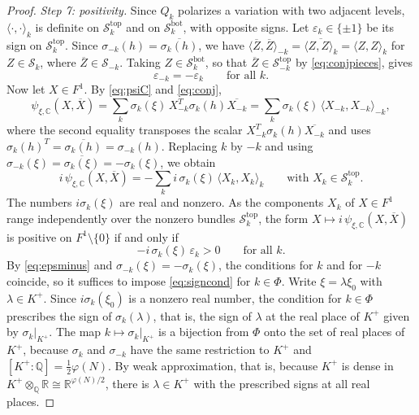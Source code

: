 \documentclass[11pt]{amsart}
\theoremstyle{definition}
\theoremstyle{remark}
\numberwithin{equation}{section}
\newcommand{\Q}{\mathbb{Q}}
\newcommand{\C}{\mathbb{C}}
\newcommand{\R}{\mathbb{R}}
\newcommand{\cS}{\mathcal{S}}
\newcommand{\tp}{\mathrm{top}}
\newcommand{\bt}{\mathrm{bot}}
\begin{document}
\begin{proof}
\emph{Step 7: positivity.} Since $Q_k$ polarizes a variation with two adjacent levels, $\langle\cdot,\cdot\rangle_k$ is definite on $\cS_k^{\tp}$ and on $\cS_k^{\bt}$, with opposite signs. Let $\varepsilon_k\in\{\pm1\}$ be its sign on $\cS_k^{\tp}$. Since $\sigma_{-k}(h)=\overline{\sigma_k(h)}$, we have $\langle\overline Z,\overline Z\rangle_{-k}=\overline{\langle Z,Z\rangle_k}=\langle Z,Z\rangle_k$ for $Z\in\cS_k$, where $\overline Z\in\cS_{-k}$. Taking $Z\in\cS_k^{\bt}$, so that $\overline Z\in\cS_{-k}^{\tp}$ by \eqref{eq:conjpieces}, gives
\begin{equation}\label{eq:epsminus}
\varepsilon_{-k}=-\varepsilon_k\qquad\text{for all }k .
\end{equation}
Now let $X\in F^1$. By \eqref{eq:psiC} and \eqref{eq:conj},
\[
\psi_{\xi,\C}(X,\overline X)=\sum_k\sigma_k(\xi)\,X_{-k}^{T}\sigma_k(h)\overline{X_{-k}}=\sum_k\sigma_k(\xi)\,\langle X_{-k},X_{-k}\rangle_{-k} ,
\]
where the second equality transposes the scalar $X_{-k}^{T}\sigma_k(h)\overline{X_{-k}}$ and uses $\sigma_k(h)^T=\overline{\sigma_k(h)}=\sigma_{-k}(h)$. Replacing $k$ by $-k$ and using $\sigma_{-k}(\xi)=\overline{\sigma_k(\xi)}=-\sigma_k(\xi)$, we obtain
\begin{equation}\label{eq:positivity}
i\,\psi_{\xi,\C}(X,\overline X)=-\sum_ki\,\sigma_k(\xi)\,\langle X_k,X_k\rangle_k\qquad\text{with }X_k\in\cS_k^{\tp}.
\end{equation}
The numbers $i\sigma_k(\xi)$ are real and nonzero. As the components $X_k$ of $X\in F^1$ range independently over the nonzero bundles $\cS_k^{\tp}$, the form $X\mapsto i\,\psi_{\xi,\C}(X,\overline X)$ is positive on $F^1\setminus\{0\}$ if and only if
\begin{equation}\label{eq:signcond}
-i\,\sigma_k(\xi)\,\varepsilon_k>0\qquad\text{for all }k .
\end{equation}
By \eqref{eq:epsminus} and $\sigma_{-k}(\xi)=-\sigma_k(\xi)$, the conditions for $k$ and for $-k$ coincide, so it suffices to impose \eqref{eq:signcond} for $k\in\Phi$. Write $\xi=\lambda\xi_0$ with $\lambda\in K^+$. Since $i\sigma_k(\xi_0)$ is a nonzero real number, the condition for $k\in\Phi$ prescribes the sign of $\sigma_k(\lambda)$, that is, the sign of $\lambda$ at the real place of $K^+$ given by $\sigma_k|_{K^+}$. The map $k\mapsto\sigma_k|_{K^+}$ is a bijection from $\Phi$ onto the set of real places of $K^+$, because $\sigma_k$ and $\sigma_{-k}$ have the same restriction to $K^+$ and $[K^+:\Q]=\frac12\varphi(N)$. By weak approximation, that is, because $K^+$ is dense in $K^+\otimes_\Q\R\cong\R^{\varphi(N)/2}$, there is $\lambda\in K^+$ with the prescribed signs at all real places.


\end{proof}
\end{document}
